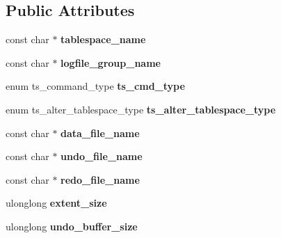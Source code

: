 \subsection*{Public Attributes}
\begin{DoxyCompactItemize}
\item 
\mbox{\label{classst__alter__tablespace_a859501375c256dafa760470654b50c1d}} 
const char $\ast$ {\bfseries tablespace\+\_\+name}
\item 
\mbox{\label{classst__alter__tablespace_a719cbc578832e79886aa419a5f942bce}} 
const char $\ast$ {\bfseries logfile\+\_\+group\+\_\+name}
\item 
\mbox{\label{classst__alter__tablespace_a731616d9f3bca1bde458787e3c67cb39}} 
enum ts\+\_\+command\+\_\+type {\bfseries ts\+\_\+cmd\+\_\+type}
\item 
\mbox{\label{classst__alter__tablespace_ac66c1ae91459a12e4aafb1fcd1519aa6}} 
enum ts\+\_\+alter\+\_\+tablespace\+\_\+type {\bfseries ts\+\_\+alter\+\_\+tablespace\+\_\+type}
\item 
\mbox{\label{classst__alter__tablespace_ae216bac33b408a46e6bfc5af34e221ef}} 
const char $\ast$ {\bfseries data\+\_\+file\+\_\+name}
\item 
\mbox{\label{classst__alter__tablespace_a82e4010259c9ca3f5f9dd8b5b80f655f}} 
const char $\ast$ {\bfseries undo\+\_\+file\+\_\+name}
\item 
\mbox{\label{classst__alter__tablespace_a6d2f80303a99d74aa799d881c2d74762}} 
const char $\ast$ {\bfseries redo\+\_\+file\+\_\+name}
\item 
\mbox{\label{classst__alter__tablespace_a5d7d145186ff49f368035ac096023d91}} 
ulonglong {\bfseries extent\+\_\+size}
\item 
\mbox{\label{classst__alter__tablespace_a29d450a36c01ad85628fc99a2f41f812}} 
ulonglong {\bfseries undo\+\_\+buffer\+\_\+size}
\item 

\end{DoxyCompactItemize}
